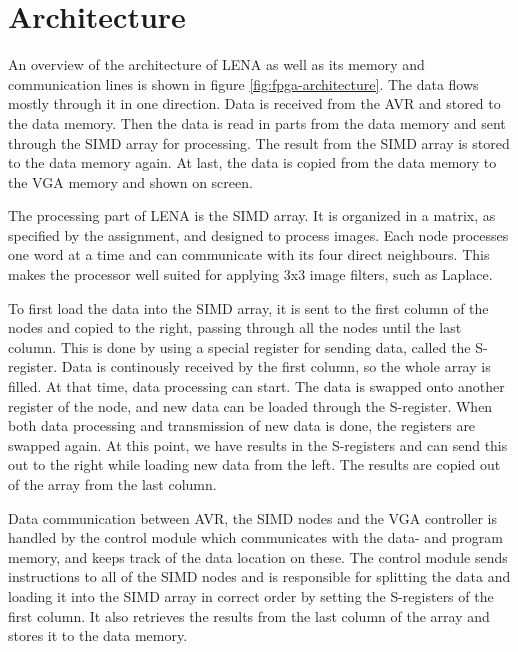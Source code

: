 \section{Architecture}




An overview of the architecture of \ac{LENA} as well as its memory and communication
lines is shown in figure \ref{fig:fpga-architecture}. The data flows mostly
through it in one direction. Data is received from the AVR and stored to the
data memory. Then the data is read in parts from the data memory and sent
through the \ac{SIMD} array for processing. The result from the \ac{SIMD} array is stored
to the data memory again. At last, the data is copied from the data memory to
the \ac{VGA} memory and shown on screen.

The processing part of \ac{LENA} is the \ac{SIMD} array. It is organized in a matrix, as
specified by the assignment, and designed to process images. Each node processes
one word at a time and can communicate with its four direct neighbours. This
makes the processor well suited for applying 3x3 image filters, such as Laplace.

To first load the data into the \ac{SIMD} array, it is sent to the first column of
the nodes and copied to the right, passing through all the nodes until the last
column.  This is done by using a special register for sending data, called the
S-register. Data is continously received by the first column, so the whole array
is filled. At that time, data processing can start. The data is swapped onto
another register of the node, and new data can be loaded through the S-register.
When both data processing and transmission of new data is done, the registers
are swapped again. At this point, we have results in the S-registers and can
send this out to the right while loading new data from the left. The results are
copied out of the array from the last column.

Data communication between AVR, the \ac{SIMD} nodes and the \ac{VGA}
controller is handled by the control module which communicates with the data-
and program memory, and keeps track of the data location on these. The control
module sends instructions to all of the \ac{SIMD} nodes and is responsible for
splitting the data and loading it into the \ac{SIMD} array in correct order by
setting the S-registers of the first column. It also retrieves the results from
the last column of the array and stores it to the data memory.


